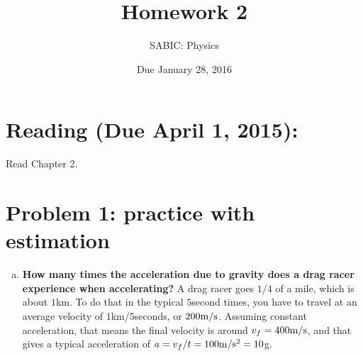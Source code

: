 \documentclass[10pt,letter]{article}
\begin{document}


\title{Homework 2}

\author{SABIC: Physics}

\date{Due January 28, 2016}
 
\maketitle 

\section*{Reading (Due April 1, 2015):}
Read Chapter 2.
\section*{Problem 1: practice with estimation}
\begin{enumerate}[(a)]
\item {\bf How many times the acceleration due to gravity does a drag racer experience when accelerating?}
A drag racer goes $1/4$ of a mile, which is about $1$km. To do that in the typical $5$second times, you have to travel at an average velocity of $1$km/$5$seconds, or $200{\rm m}/{\rm s}$. Assuming constant acceleration, that means the final velocity is around $v_f = 400 {\rm m}/{\rm s}$, and that gives a typical acceleration of $a = v_f/t = 100 {\rm m}/{\rm s}^2 = 10$g. 
\end{enumerate}
\end{document}
